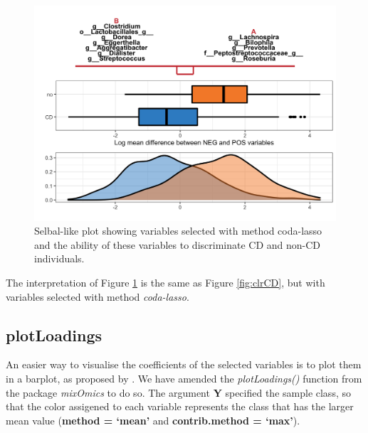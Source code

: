 \documentclass[openany]{book}
\begin{document}
\begin{figure}

{\centering \includegraphics[width=1\linewidth]{./Generated_plots/codaCD-1} 

}

\caption{Selbal-like plot showing variables selected with method coda-lasso and the ability of these variables to discriminate CD and non-CD individuals.}\label{fig:codaCD}
\end{figure}

The interpretation of Figure \ref{fig:codaCD} is the same as Figure
\ref{fig:clrCD}, but with variables selected with method
\emph{coda-lasso}.

\subsection{plotLoadings}\label{plotloadings}

An easier way to visualise the coefficients of the selected variables is
to plot them in a barplot, as proposed by \citet{rohart2017mint}. We
have amended the \emph{plotLoadings()} function from the package
\emph{mixOmics} to do so. The argument \textbf{Y} specified the sample
class, so that the color assigened to each variable represents the class
that has the larger mean value (\textbf{method = `mean'} and
\textbf{contrib.method = `max'}).
\end{document}
